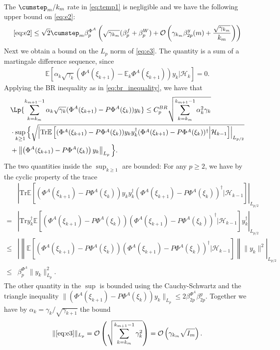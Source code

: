 \documentclass[11pt]{article}
\begin{document}
The $\cumstep_m/k_m$ rate in \eqref{eq:temp1} is negligible and we have the following upper bound on \eqref{eq:e2}:
\begin{equation}
    \eqref{eq:e2} \leq 
        \sqrt{2} \cumstep_m \beta_p^{\Phi^A} \left(\sqrt{\gamma_{k_m}} (\beta_p^f + \beta_p^W)
    + \mathcal{O}\left(\gamma_{k_m} \beta_{2p}^y (m) + \frac{\sqrt{\gamma_{k_m}}}{k_m} \right)\right)  
\end{equation}
Next we obtain a bound on the $L_p$ norm of \eqref{eq:e3}. 
The quantity is a sum of a martingale difference sequence, since
\begin{align*}
    \mathbb{E}\left[\alpha_k \sqrt{\gamma_k} (\Phi^A (\xi_{k+1}) - \mathbb{E}_k \Phi^A (\xi_{k+1}) )y_k \Big| \mathcal{H}_k \right] = 0 . 
\end{align*}
Applying the BR inequality as in \eqref{eq:br_inequality}, we have that 
\begin{align*}
&\Lp{\sum_{k=k_m}^{k_{m+1} - 1} \alpha_k \sqrt{\gamma_k} (\Phi^A (\xi_{k+1}) - P \Phi^A (\xi_k) ) y_k}
\leq   
     C_p^{BR}    \sqrt{\sum_{k=k_m}^{k_{m+1} - 1}\alpha_k^2 \gamma_k}
     \\ &
     \cdot      \sup_{k \geq 1}\Big\{
\sqrt{ \left\lvert \mathrm{Tr} \mathbb{E}\left[
    (\Phi^A (\xi_{k+1}) - P \Phi^A(\xi_k)) y_k y_k^\dagger (\Phi^A (\xi_{k+1}) - P \Phi^A(\xi_k))^\dagger \Big| \mathcal{H}_{k-1} 
    \right] \right\rvert_{L_{p/2}}} \\ 
    &+
    \left\lVert \left(\Phi^A(\xi_{k+1}) - P \Phi^A (\xi_{k})\right) y_k \right\rVert_{L_p}
    \Big\}
    .
\end{align*}
The two quantities inside the $\sup_{k \geq 1}$ are bounded: For any $p \geq 2$, we have by the cyclic property of the trace
\begin{align*}
    &\left\lvert \mathrm{Tr} \mathbb{E}\left[
    (\Phi^A (\xi_{k+1}) - P \Phi^A(\xi_k)) y_k y_k^\dagger (\Phi^A (\xi_{k+1}) - P \Phi^A(\xi_k))^\dagger \Big| \mathcal{H}_{k-1} 
    \right]\right\rvert_{L_{p/2}}
    \\ = &
    \left\lvert \mathrm{Tr} y_k^\dagger \mathbb{E}\left[ 
    (\Phi^A(\xi_{k+1} ) - P \Phi^A(\xi_k) ) (\Phi^A(\xi_{k+1} ) - P \Phi^A(\xi_k) ) ^\dagger | \mathcal{H}_{k-1}
    \right] y_k^\dagger \right\rvert_{L_{p/2}}
    \\ \leq &
    \left\lvert 
    \left\lVert \mathbb{E} \left[(\Phi^A(\xi_{k+1} ) - P \Phi^A(\xi_k) ) (\Phi^A(\xi_{k+1} ) - P \Phi^A(\xi_k) ) ^\dagger | \mathcal{H}_{k-1} \right] \right\rVert \lVert y_k \rVert^2
    \right\rvert_{L_{p/2}}
    \\ \leq &
    \beta_p^{\Phi^A} \lVert y_k \rVert^2_{L_p} . 
\end{align*}
The other quantity in the $\sup$ is bounded using the Cauchy-Schwartz and the triangle inequality $\lVert (\Phi^A(\xi_{k+1}) - P \Phi^A(\xi_k))y_k \rVert_{L_p} \leq 2\beta_{2p}^{\Phi^A} \beta_{2p}^y$. 
Together we have by $\alpha_k = \gamma_k/\sqrt{\gamma_{k+1}}$ the bound
\begin{equation}
    \lVert \eqref{eq:e3}\rVert_{L_p} = \mathcal{O}\left(\sqrt{\sum_{k=k_m}^{k_{m+1} - 1} \gamma_k^{2} }\right) 
    = \mathcal{O}\left(\gamma_{k_m} \sqrt{I_m}\right) . 
\end{equation}
\end{document}
